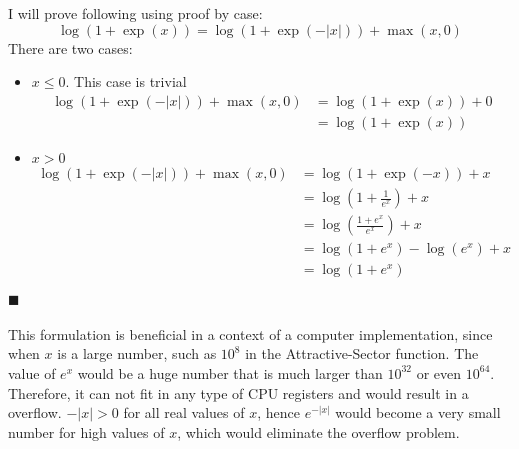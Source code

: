 \documentclass[a4paper]{article}
\newcommand*{\QEDA}{\hfill\ensuremath{\blacksquare}}%
\begin{document}
\section{}

\section{}
I will prove following using proof by case:
\[
\log (1+\exp (x))=\log (1+\exp (-|x|))+\max (x, 0)
\]
There are two cases:
\begin{itemize}
\item $x \leq 0$. This case is trivial
  \begin{align*}
    \log (1+\exp (-|x|))+\max (x, 0) &= \log (1+\exp (x)) + 0\\
    &= \log (1+\exp(x))
  \end{align*}
\item $x > 0$
  \begin{align*}
    \log (1+\exp (-|x|))+\max (x, 0) &= \log (1+\exp (-x)) + x\\
    &=\log \left(1 + \frac{1}{e^{x}}\right) + x\\
    &=\log \left(\frac{1 + e^{x}}{e^{x}}\right) + x\\
    &=\log (1 + e^{x}) - \log \left(e^{x}\right) + x\\
    &=\log (1 + e^{x})
  \end{align*}
\end{itemize}
\QEDA\\\\
This formulation is beneficial in a context of a computer implementation, since
when $x$ is a large number, such as $10^8$ in the Attractive-Sector function.
The value of $e^{x}$ would be a huge number that is much larger than
$10^{32}$ or even $10^{64}$. Therefore, it can not fit in any type of CPU
registers and would result in a overflow. $-|x| > 0$ for all real values of $x$,
hence $e^{-|x|}$ would become a very small number for high values of $x$, which
would eliminate the overflow problem.



\end{document}
